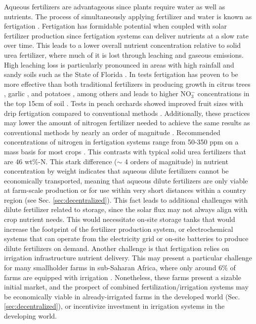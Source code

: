 Aqueous fertilizers are advantageous since plants require water as well as nutrients. The process of simultaneously applying fertilizer and water is known as fertigation \cite{kafkafi2011fertigation,goyal2016water}. Fertigation has formidable potential when coupled with solar fertilizer production since fertigation systems can deliver nutrients at a slow rate over time. This leads to a lower overall nutrient concentration relative to solid urea fertilizer, where much of it is lost through leaching and gaseous emissions. High leaching loss is particularly pronounced in areas with high rainfall and sandy soils such as the State of Florida \cite{kadyampakeni_2015}. In tests fertigation has proven to be more effective than both traditional fertilizers in producing growth in citrus trees \cite{Morgan2009}, garlic \cite{Jamil_Mohammad_2002}, and potatoes \cite{Feng_2017}, among others \cite{Bar_Yosef_1999,kafkafi2011fertigation} and leads to higher NO$_3^-$ concentrations in the top 15cm of soil \cite{Willis1991}. Tests in peach orchards showed improved fruit sizes with drip fertigation compared to conventional methods \cite{Bryla2005}. Additionally, these practices may lower the amount of nitrogen fertilizer needed to achieve the same results as conventional methods by nearly an order of magnitude \cite{kadyampakeni_2015}. 
Recommended concentrations of nitrogen in fertigation systems range from 50-350 ppm on a mass basis for most crops \cite{phocaides2007handbook,Papadopoulos_1988}. This contrasts with typical solid urea fertilizers that are 46 wt\%-N. This stark difference ($\sim$ 4 orders of magnitude) in nutrient concentration by weight indicates that aqueous dilute fertilizers cannot be economically transported, meaning that aqueous dilute fertilizers are only viable at farm-scale production or for use within very short distances within a country region (see Sec. \ref{sec:decentralized}). This fact leads to additional challenges with dilute fertilizer related to storage, since the solar flux may not always align with crop nutrient needs. This would necessitate on-site storage tanks that would increase the footprint of the fertilizer production system, or electrochemical systems that can operate from the electricity grid or on-site batteries to produce dilute fertilizers on demand. Another challenge is that fertigation relies on irrigation infrastructure nutrient delivery. This may present a particular challenge for many smallholder farms in sub-Saharan Africa, where only around 6\%  of farms are equipped with irrigation \cite{You_2011}. Nonetheless, these farms present a sizable initial market, and the prospect of combined fertilization/irrigation systems may be economically viable in already-irrigated farms in the developed world (Sec. \ref{sec:decentralized}), or incentivize investment in irrigation systems in the developing world.

